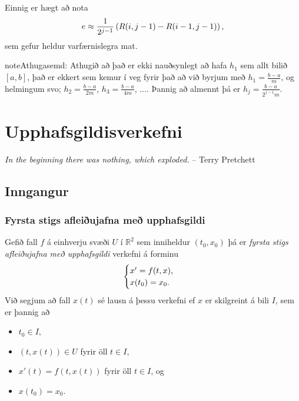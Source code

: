 \documentclass[letterpaper,10pt,icelandic]{sphinxmanual}
\begin{document}
Einnig er hægt að nota
\begin{gather}
\begin{split}e \approx \frac{1}{2^{j-1}}\left( R(i,j-1) - R(i-1,j-1)\right),\end{split}\notag
\end{gather}
sem gefur heldur varfærnislegra mat.

\begin{notice}{note}{Athugasemd:}
Athugið að það er ekki nauðsynlegt að hafa \(h_1\) sem allt bilið
\([a,b]\), það er ekkert sem kemur í veg fyrir það að við byrjum
með \(h_1 = \frac{b-a}{m}\), og helmingum svo;
\(h_2 = \frac{b-a}{2m}\), \(h_3 = \frac{b-a}{4m}\),
\(\ldots\).
Þannig að almennt þá er \(h_j=\frac{b-a}{2^{j-1}m}\).
\end{notice}
\label{kafli06:upphafsgildisverkefni}

\chapter{Upphafsgildisverkefni}
\label{kafli06::doc}\label{kafli06:id1}\label{kafli06:index-0}
\emph{In the beginning there was nothing, which exploded.}
-- Terry Pretchett


\section{Inngangur}
\label{kafli06:inngangur}

\subsection{Fyrsta stigs afleiðujafna með upphafsgildi}
\label{kafli06:index-1}\label{kafli06:fyrsta-stigs-afleiujafna-me-upphafsgildi}
Gefið fall \(f\) á einhverju svæði \(U\) í
\(\mathbb{R}^2\) sem inniheldur \((t_0,x_0)\) þá er
\emph{fyrsta stigs afleiðujafna með upphafsgildi} verkefni á forminu
\begin{gather}
\begin{split}\begin{cases}
x' = f(t,x),\\
x(t_0) = x_0.
\end{cases}\end{split}\notag
\end{gather}
Við segjum að fall \(x(t)\) sé lausn á þessu verkefni ef \(x\) er
skilgreint á bili \(I\), sem er þannig að
\begin{itemize}
\item {} 
\(t_0 \in I\),

\item {} 
\((t,x(t)) \in U\) fyrir öll \(t \in I\),

\item {} 
\(x'(t) = f(t,x(t))\) fyrir öll \(t \in I\), og

\item {} 
\(x(t_0) = x_0\).

\end{itemize}
\end{document}
